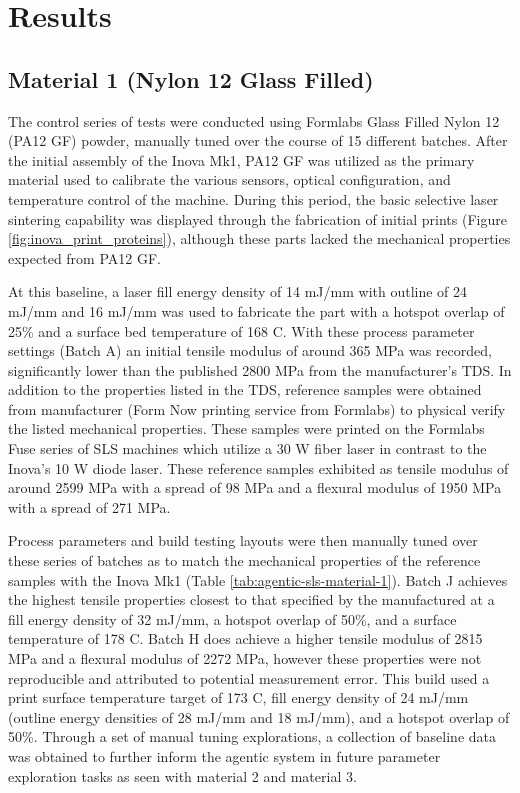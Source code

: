 \section{Results}
\subsection{Material 1 (Nylon 12 Glass Filled)}
The control series of tests were conducted using Formlabs Glass Filled Nylon 12
(PA12 GF) powder, manually tuned over the course of 15 different batches. After
the initial assembly of the Inova Mk1, PA12 GF was utilized as the primary
material used to calibrate the various sensors, optical configuration, and
temperature control of the machine. During this period, the basic selective
laser sintering capability was displayed through the fabrication of initial
prints (Figure \ref{fig:inova_print_proteins}), although these parts lacked the
mechanical properties expected from PA12 GF.

At this baseline, a laser fill energy density of 14 mJ/mm with outline of 24
mJ/mm and 16 mJ/mm was used to fabricate the part with a hotspot overlap of 25\%
and a surface bed temperature of 168 C. With these process parameter settings
(Batch A) an initial tensile modulus of around 365 MPa was recorded,
significantly lower than the published 2800 MPa from the manufacturer's TDS. In
addition to the properties listed in the TDS, reference samples were obtained
from manufacturer (Form Now printing service from Formlabs) to physical verify
the listed mechanical properties. These samples were printed on the Formlabs
Fuse series of SLS machines which utilize a 30 W fiber laser in contrast to the
Inova's 10 W diode laser. These reference samples exhibited as tensile modulus
of around 2599 MPa with a spread of 98 MPa and a flexural modulus of 1950 MPa
with a spread of 271 MPa.

Process parameters and build testing layouts were then manually tuned over these
series of batches as to match the mechanical properties of the reference samples
with the Inova Mk1 (Table \ref{tab:agentic-sls-material-1}). Batch J achieves
the highest tensile properties closest to that specified by the manufactured at
a fill energy density of 32 mJ/mm, a hotspot overlap of 50\%, and a surface
temperature of 178 \textdegree C.  Batch H does achieve a higher tensile modulus
of 2815  MPa and a flexural modulus of 2272  MPa, however
these properties were not reproducible and attributed to potential measurement
error. This build used a print surface temperature target of 173 C, fill energy
density of 24 mJ/mm (outline energy densities of 28 mJ/mm and 18 mJ/mm), and a
hotspot overlap of 50\%. Through a set of manual tuning explorations, a
collection of baseline data was obtained to further inform the agentic system in
future parameter exploration tasks as seen with material 2 and material 3.

